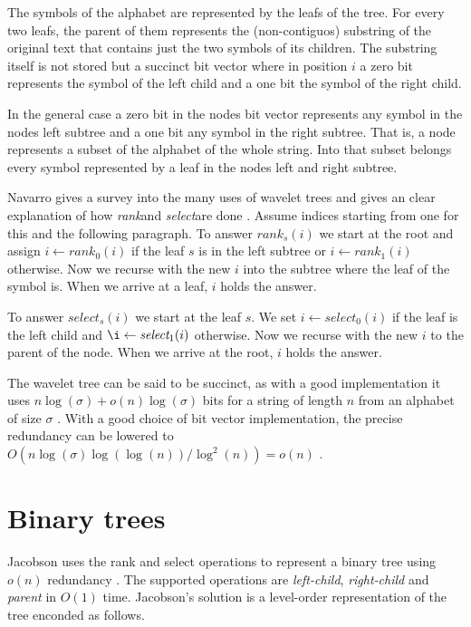 \documentclass[11pt]{article}
\newcommand{\bigo}{O}
\newcommand{\smallo}{o}
\newcommand{\rank}{\textit{rank}}
\newcommand{\select}{\textit{select}}
\begin{document}
The symbols of the alphabet are represented by the leafs of the tree.
For every two leafs, the parent of them represents the (non-contiguos)
substring of the original text that contains just the two symbols of
its children. The substring itself is not stored but a succinct bit
vector where in position $i$ a zero bit represents the symbol of the
left child and a one bit the symbol of the right child.

In the general case a zero bit in the nodes bit vector represents any
symbol in the nodes left subtree and a one bit any symbol in the right
subtree. That is, a node represents a subset of the alphabet of the
whole string. Into that subset belongs every symbol represented by a
leaf in the nodes left and right subtree.

Navarro gives a survey into the many uses of wavelet trees and gives
an clear explanation of how \rank and \select are done
\cite{navarro12}. Assume indices starting from one for this and the
following paragraph. To answer $\rank_s(i)$ we start at the root and
assign $i \gets \rank_0(i)$ if the leaf $s$ is in the left subtree or
$i \gets \rank_1(i)$ otherwise. Now we recurse with the new $i$ into
the subtree where the leaf of the symbol is. When we arrive at a leaf,
$i$ holds the answer.

To answer $\select_s(i)$ we start at the leaf $s$. We set $i \gets
\select_0(i)$ if the leaf is the left child and $\i \gets
\select_1(i)$ otherwise. Now we recurse with the new $i$ to the parent
of the node. When we arrive at the root, $i$ holds the answer.

The wavelet tree can be said to be succinct, as with a good
implementation it uses $n\log(\sigma) + \smallo(n)\log(\sigma)$ bits
for a string of length $n$ from an alphabet of size $\sigma$
\cite{navarro12}. With a good choice of bit vector implementation, the
precise redundancy can be lowered to $\bigo(n\log(\sigma)\log(\log(n))
/ \log^2(n)) = \smallo(n)$ \cite{navarro12}.

\section{Binary trees}

Jacobson uses the rank and select operations to represent a binary
tree using $\smallo(n)$ redundancy \cite{jacobson89}. The supported
operations are \textit{left-child}, \textit{right-child} and
\textit{parent} in $\bigo(1)$ time. Jacobson's solution is a
level-order representation of the tree enconded as follows.
\end{document}
